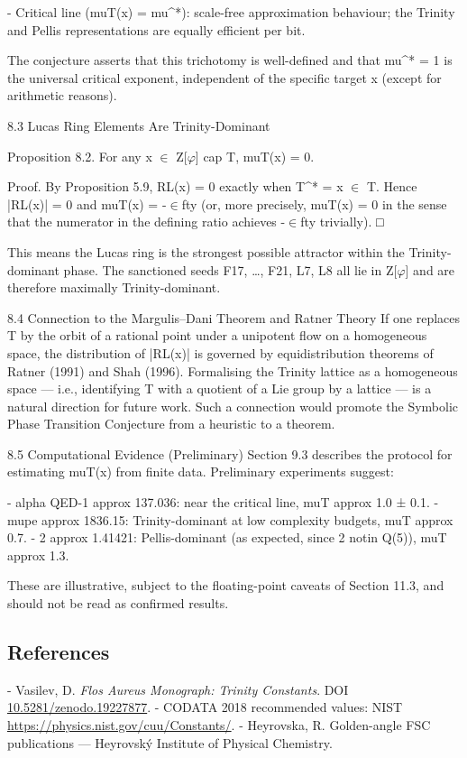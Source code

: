   - Critical line (muT(x) = mu^*): scale-free approximation behaviour; the Trinity and
  Pellis representations are equally efficient per bit.

  The conjecture asserts that this trichotomy is well-defined and that mu^* = 1 is the
  universal critical exponent, independent of the specific target x (except for arithmetic
  reasons).

  8.3 Lucas Ring Elements Are Trinity-Dominant

        Proposition 8.2. For any x $\in$ Z[$\varphi$] cap T, muT(x) = 0.

        Proof. By Proposition 5.9, RL(x) = 0 exactly when T^* = x $\in$ T. Hence |RL(x)| = 0
        and muT(x) = -$\in$fty (or, more precisely, muT(x) = 0 in the sense that the
        numerator in the defining ratio achieves -$\in$fty trivially). □

  This means the Lucas ring is the strongest possible attractor within the
  Trinity-dominant phase. The sanctioned seeds F17, …, F21, L7, L8 all lie in Z[$\varphi$] and are
  therefore maximally Trinity-dominant.

  8.4 Connection to the Margulis--Dani Theorem and Ratner Theory
  If one replaces T by the orbit of a rational point under a unipotent flow on a
  homogeneous space, the distribution of |RL(x)| is governed by equidistribution
  theorems of Ratner (1991) and Shah (1996). Formalising the Trinity lattice as a
  homogeneous space --- i.e., identifying T with a quotient of a Lie group by a lattice --- is
  a natural direction for future work. Such a connection would promote the Symbolic
  Phase Transition Conjecture from a heuristic to a theorem.

  8.5 Computational Evidence (Preliminary)
  Section 9.3 describes the protocol for estimating muT(x) from finite data. Preliminary
  experiments suggest:

  - alpha QED-1 approx 137.036: near the critical line, muT approx 1.0 ± 0.1.
  - mupe approx 1836.15: Trinity-dominant at low complexity budgets, muT approx 0.7.
  - 2 approx 1.41421: Pellis-dominant (as expected, since 2 notin Q(5)), muT approx 1.3.

  These are illustrative, subject to the floating-point caveats of Section 11.3, and should
  not be read as confirmed results.

\subsection{References}

- Vasilev, D. \textit{Flos Aureus Monograph: Trinity Constants}. DOI \href{https://zenodo.org/doi/10.5281/zenodo.19227877}{10.5281/zenodo.19227877}.
- CODATA 2018 recommended values: NIST \href{https://physics.nist.gov/cuu/Constants/}{https://physics.nist.gov/cuu/Constants/}.
- Heyrovska, R. Golden-angle FSC publications --- Heyrovský Institute of Physical Chemistry.
